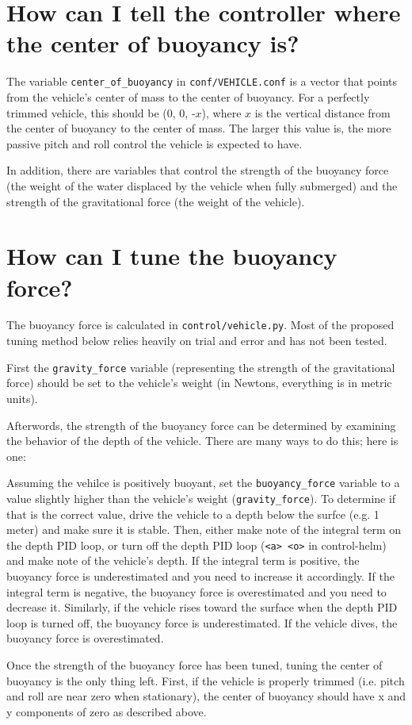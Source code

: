 \documentclass[11pt]{article}
\newcommand{\question}[1] %
{
  \section{#1}
}
\begin{document}
\question{How can I tell the controller where the center of buoyancy is?}

    The variable \texttt{center\_of\_buoyancy} in \texttt{conf/VEHICLE.conf} is a vector that points from the vehicle's center of mass to the center of buoyancy. For a perfectly trimmed vehicle, this should be (0, 0, -$x$), where $x$ is the vertical distance from the center of buoyancy to the center of mass. The larger this value is, the more passive pitch and roll control the vehicle is expected to have.

    In addition, there are variables that control the strength of the buoyancy force (the weight of the water displaced by the vehicle when fully submerged) and the strength of the gravitational force (the weight of the vehicle).\\

\question{How can I tune the buoyancy force?}

    The buoyancy force is calculated in \texttt{control/vehicle.py}. Most of the proposed tuning method below relies heavily on trial and error and has not been tested.

    First the \texttt{gravity\_force} variable (representing the strength of the gravitational force) should be set to the vehicle's weight (in Newtons, everything is in metric units).

    Afterwords, the strength of the buoyancy force can be determined by examining the behavior of the depth of the vehicle. There are many ways to do this; here is one:

    Assuming the vehilce is positively buoyant, set the \texttt{buoyancy\_force} variable to a value slightly higher than the vehicle's weight (\texttt{gravity\_force}). To determine if that is the correct value, drive the vehicle to a depth below the surfce (e.g. 1 meter) and make sure it is stable. Then, either make note of the integral term on the depth PID loop, or turn off the depth PID loop (\texttt{<a> <o>} in control-helm) and make note of the vehicle's depth. If the integral term is positive, the buoyancy force is underestimated and you need to increase it accordingly. If the integral term is negative, the buoyancy force is overestimated and you need to decrease it. Similarly, if the vehicle rises toward the surface when the depth PID loop is turned off, the buoyancy force is underestimated. If the vehicle dives, the buoyancy force is overestimated.

    Once the strength of the buoyancy force has been tuned, tuning the center of buoyancy is the only thing left. First, if the vehicle is properly trimmed (i.e. pitch and roll are near zero when stationary), the center of buoyancy should have x and y components of zero as described above.
\end{document}
